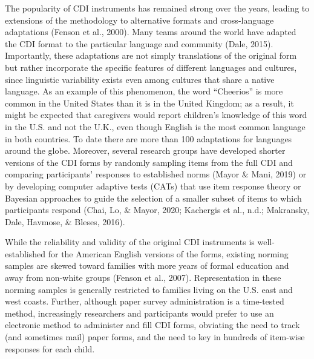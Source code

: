 \documentclass[
  english,
  ,man,floatsintext]{apa6}
\begin{document}
The popularity of CDI instruments has remained strong over the years, leading to extensions of the methodology to alternative formats and cross-language adaptations (Fenson et al., 2000). Many teams around the world have adapted the CDI format to the particular language and community (Dale, 2015). Importantly, these adaptations are not simply translations of the original form but rather incorporate the specific features of different languages and cultures, since linguistic variability exists even among cultures that share a native language. As an example of this phenomenon, the word ``Cheerios'' is more common in the United States than it is in the United Kingdom; as a result, it might be expected that caregivers would report children's knowledge of this word in the U.S. and not the U.K., even though English is the most common language in both countries. To date there are more than 100 adaptations for languages around the globe. Moreover, several research groups have developed shorter versions of the CDI forms by randomly sampling items from the full CDI and comparing participants' responses to established norms (Mayor \& Mani, 2019) or by developing computer adaptive tests (CATs) that use item response theory or Bayesian approaches to guide the selection of a smaller subset of items to which participants respond (Chai, Lo, \& Mayor, 2020; Kachergis et al., n.d.; Makransky, Dale, Havmose, \& Bleses, 2016).

While the reliability and validity of the original CDI instruments is well-established for the American English versions of the forms, existing norming samples are skewed toward families with more years of formal education and away from non-white groups (Fenson et al., 2007). Representation in these norming samples is generally restricted to families living on the U.S. east and west coasts. Further, although paper survey administration is a time-tested method, increasingly researchers and participants would prefer to use an electronic method to administer and fill CDI forms, obviating the need to track (and sometimes mail) paper forms, and the need to key in hundreds of item-wise responses for each child.
\end{document}
